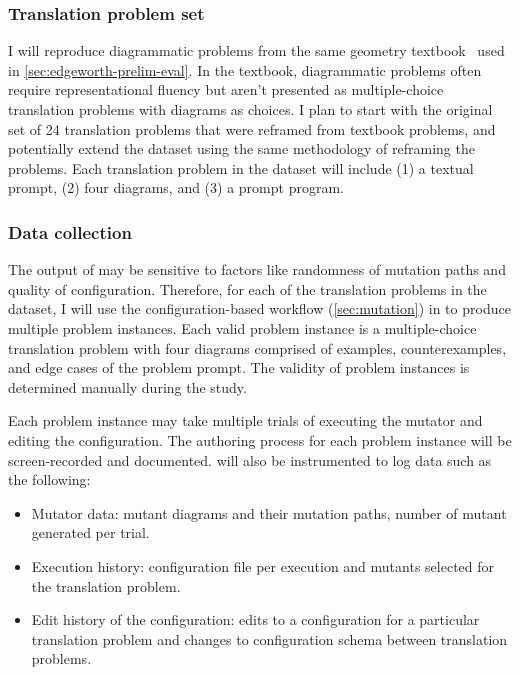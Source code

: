 \subsubsection{Translation problem set} 

I will reproduce diagrammatic problems from the same geometry textbook~\cite{holtGeometry} used in \cref{sec:edgeworth-prelim-eval}. In the textbook, diagrammatic problems often require representational fluency but aren't presented as multiple-choice translation problems with diagrams as choices. I plan to start with the original set of 24 translation problems that were reframed from textbook problems, and potentially extend the dataset using the same methodology of reframing the problems. Each translation problem in the dataset will include (1) a textual prompt, (2) four diagrams, and (3) a \Substance prompt program.

\subsubsection{Data collection} 

The output of \Edgeworth may be sensitive to factors like randomness of mutation paths and quality of configuration. Therefore, for each of the translation problems in the dataset, I will use the configuration-based workflow (\cref{sec:mutation}) in \Edgeworth to produce multiple problem instances. Each valid problem instance is a multiple-choice translation problem with four diagrams comprised of examples, counterexamples, and edge cases of the problem prompt. The validity of problem instances is determined manually during the study. 

Each problem instance may take multiple trials of executing the mutator and editing the configuration. The authoring process for each problem instance will be screen-recorded and documented. \Edgeworth will also be instrumented to log data such as the following:

\begin{itemize}
    \item Mutator data: mutant diagrams and their mutation paths, number of mutant generated per trial.
    \item Execution history: configuration file per execution and mutants selected for the translation problem.
    \item Edit history of the configuration: edits to a configuration for a particular translation problem and changes to configuration schema between translation problems.
\end{itemize}

